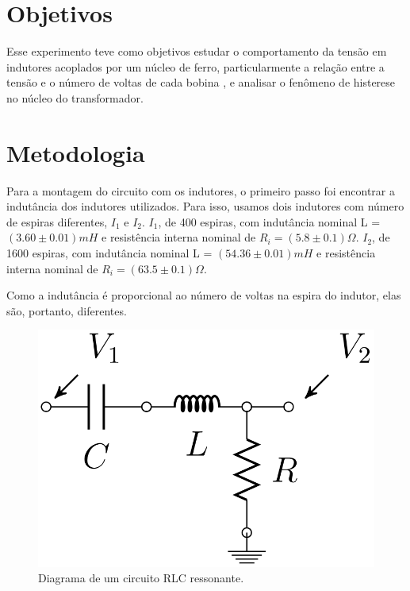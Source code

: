 \documentclass[11pt,a4paper]{article}
\begin{document}
    
%
%
\section{Objetivos}
    Esse experimento teve como objetivos estudar o comportamento da tensão em indutores acoplados por um núcleo de ferro, particularmente a relação entre a tensão e o número de voltas de cada bobina , e analisar o fenômeno de histerese no núcleo do transformador.
    
%
%
\section{Metodologia}

    Para a montagem do circuito com os indutores, o primeiro passo foi encontrar a indutância dos indutores utilizados. Para isso, usamos dois indutores com número de espiras diferentes, $I_1$ e $I_2$. $I_1$, de 400 espiras, com indutância nominal L = $(3.60 \pm 0.01)mH$ e resistência interna nominal de $R_i=(5.8 \pm 0.1)\Omega$. $I_2$, de 1600 espiras, com indutância nominal L = $(54.36 \pm 0.01)mH$ e resistência interna nominal de $R_i=(63.5 \pm 0.1)\Omega$.
    
    Como a indutância é proporcional ao número de voltas na espira do indutor, elas são, portanto, diferentes.
	\begin{figure}[!htb]
    \centering
    \includegraphics[scale=0.15]{FIGURARLC.png}
    \caption{Diagrama de um circuito RLC ressonante.}
    \label{FIGURA RLC}
    \end{figure}
    
\end{document}
